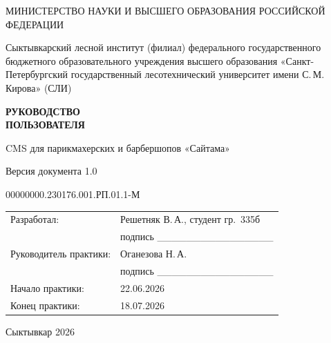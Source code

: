 



\begin{titlepage}
\centering
\vspace*{1cm}
{\large МИНИСТЕРСТВО НАУКИ И ВЫСШЕГО ОБРАЗОВАНИЯ РОССИЙСКОЙ ФЕДЕРАЦИИ\par}
\vspace{1.2em}
{\large Сыктывкарский лесной институт (филиал) федерального государственного
бюджетного образовательного учреждения высшего образования
«Санкт-Петербургский государственный лесотехнический университет
имени С.\,М.\,Кирова» (СЛИ)\par}
\vspace{3cm}
{\Huge\bfseries РУКОВОДСТВО\\[2pt]ПОЛЬЗОВАТЕЛЯ\par}
\vspace{1.2em}
{\large CMS для парикмахерских и барбершопов «Сайтама»\par}
\vspace{0.6em}
{\large Версия документа 1.0\par}
\vspace{1.5em}
00000000.230176.001.РП.01.1-М\par
\vfill
\begin{tabular}{@{}p{5.5cm}p{7.5cm}@{}}
Разработал: & Решетняк В.\,А., студент гр.\ 335б \\[2pt]
            & подпись \_\_\_\_\_\_\_\_\_\_\_\_\_\_\_\_ \\[14pt]
Руководитель практики: & Оганезова Н.\,А. \\[2pt]
            & подпись \_\_\_\_\_\_\_\_\_\_\_\_\_\_\_\_ \\[14pt]
Начало практики: & 22.06.2026 \\[2pt]
Конец практики: & 18.07.2026 \\
\end{tabular}
\vfill
Сыктывкар 2026\par
\vspace{1cm}
\end{titlepage}

